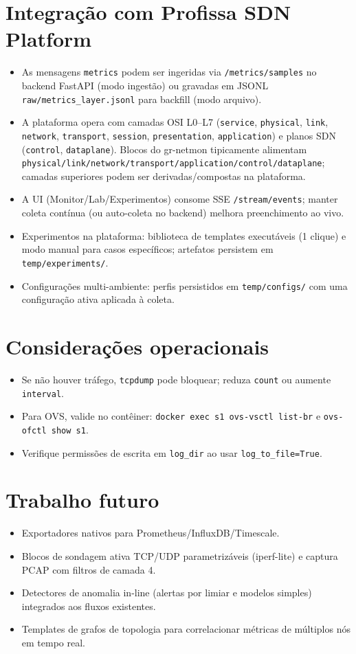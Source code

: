\documentclass[11pt,a4paper]{article}
\begin{document}
\section{Integração com Profissa SDN Platform}
\begin{itemize}[leftmargin=1.5em]
  \item As mensagens \texttt{metrics} podem ser ingeridas via \texttt{/metrics/samples} no backend FastAPI (modo ingestão) ou gravadas em JSONL \texttt{raw/metrics_{layer}.jsonl} para backfill (modo arquivo).
  \item A plataforma opera com camadas OSI L0--L7 (\texttt{service}, \texttt{physical}, \texttt{link}, \texttt{network}, \texttt{transport}, \texttt{session}, \texttt{presentation}, \texttt{application}) e planos SDN (\texttt{control}, \texttt{dataplane}). Blocos do gr-netmon tipicamente alimentam \texttt{physical/link/network/transport/application/control/dataplane}; camadas superiores podem ser derivadas/compostas na plataforma.
  \item A UI (Monitor/Lab/Experimentos) consome SSE \texttt{/stream/events}; manter coleta contínua (ou auto-coleta no backend) melhora preenchimento ao vivo.
  \item Experimentos na plataforma: biblioteca de templates executáveis (1 clique) e modo manual para casos específicos; artefatos persistem em \texttt{temp/experiments/}.
  \item Configurações multi-ambiente: perfis persistidos em \texttt{temp/configs/} com uma configuração ativa aplicada à coleta.
\end{itemize}

\section{Considerações operacionais}
\begin{itemize}[leftmargin=1.5em]
  \item Se não houver tráfego, \texttt{tcpdump} pode bloquear; reduza \texttt{count} ou aumente \texttt{interval}.
  \item Para OVS, valide no contêiner: \texttt{docker exec s1 ovs-vsctl list-br} e \texttt{ovs-ofctl show s1}.
  \item Verifique permissões de escrita em \texttt{log_dir} ao usar \texttt{log_to_file=True}.
\end{itemize}

\section{Trabalho futuro}
\begin{itemize}[leftmargin=1.5em]
  \item Exportadores nativos para Prometheus/InfluxDB/Timescale.
  \item Blocos de sondagem ativa TCP/UDP parametrizáveis (iperf-lite) e captura PCAP com filtros de camada 4.
  \item Detectores de anomalia in-line (alertas por limiar e modelos simples) integrados aos fluxos existentes.
  \item Templates de grafos de topologia para correlacionar métricas de múltiplos nós em tempo real.
\end{itemize}
\end{document}
